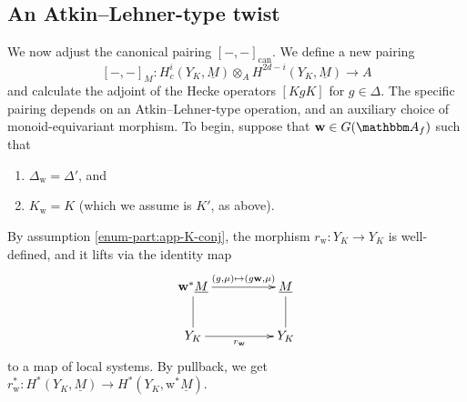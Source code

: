 \documentclass[10pt, twoside]{amsart}
\theoremstyle{plain}
\theoremstyle{definition}
\theoremstyle{remark}
\numberwithin{equation}{subsection}
\def\A{\mathbbm A}
\def\can{\mathrm{can}}
\def\can{\mathrm{can}}
\begin{document}
\begin{appendix}
\subsection{An Atkin--Lehner-type twist}\label{subsec:app-AL}
We now adjust the canonical pairing $[-,-]_{\can}$. We define a new pairing
$$
[-,-]_M : H^i_c(Y_K,\underline M) \otimes_A H^{2d-i}(Y_K,\underline M) \rightarrow A
$$
and calculate the adjoint of the Hecke operators $[KgK]$ for $g \in \Delta$. The specific pairing depends on an Atkin--Lehner-type operation, and an auxiliary choice of monoid-equivariant morphism. To begin, suppose that ${{ \boldsymbol{\mathrm{w}}}} \in G(\A_f)$ such that
\begin{enumerate}[label=(\alph*)]
\item $\Delta_{{ \boldsymbol{\mathrm{w}}}} = \Delta'$, and\label{enum-part:app-Delta-conj}
\item $K_{{ \boldsymbol{\mathrm{w}}}} = K$ (which we assume is $K'$, as above).\label{enum-part:app-K-conj}
\end{enumerate}
By assumption \ref{enum-part:app-K-conj}, the morphism $r_{{ \boldsymbol{\mathrm{w}}}} : Y_{K} \rightarrow Y_K$ is well-defined, and it lifts via the identity map
\begin{equation*}
\xymatrixcolsep{4pc}
\xymatrix{
{{ \boldsymbol{\mathrm{w}}}}^{\ast}\underline M \ar@{-}[d] \ar[r]^-{(g,\mu) \mapsto (g{{ \boldsymbol{\mathrm{w}}}}, \mu)} & \underline M \ar@{-}[d]\\
Y_K \ar[r]_{r_{{ \boldsymbol{\mathrm{w}}}}} & Y_K
}
\end{equation*}
to a map of local systems. By pullback, we get $r_{{ \boldsymbol{\mathrm{w}}}}^{\ast} : H^{\ast}(Y_K,\underline M) \rightarrow H^{\ast}(Y_K, {{ \boldsymbol{\mathrm{w}}}}^{\ast}\underline M)$. 


\end{appendix}
\end{document}
